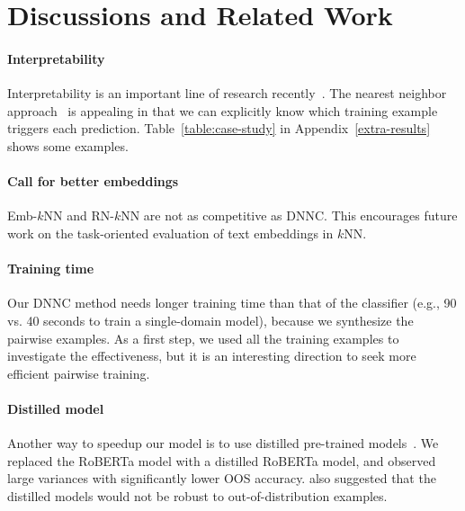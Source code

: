 \section{Discussions and Related Work}

\paragraph{Interpretability}
Interpretability is an important line of research recently~\citep{interpret-qa-1,interpret-qa-2,graph-retriever}.
The nearest neighbor approach~\citep{knn-nips} is appealing in that we can explicitly know which training example triggers each prediction.
Table~\ref{table:case-study} in Appendix~\ref{extra-results} shows some examples.

\paragraph{Call for better embeddings}
Emb-$k$NN and RN-$k$NN are not as competitive as DNNC.
This encourages future work on the task-oriented evaluation of text embeddings in $k$NN.

\paragraph{Training time}
Our DNNC method needs longer training time than that of the classifier (e.g., 90 vs. 40 seconds to train a single-domain model), because we synthesize the pairwise examples.
As a first step, we used all the training examples to investigate the effectiveness, but it is an interesting direction to seek more efficient pairwise training.

\paragraph{Distilled model}
Another way to speedup our model is to use distilled pre-trained models~\citep{distil-bert}.
We replaced the RoBERTa model with a distilled RoBERTa model,
and observed large variances with significantly lower OOS accuracy.
\citet{acl-ood} also suggested that the distilled models would not be robust to out-of-distribution examples.

